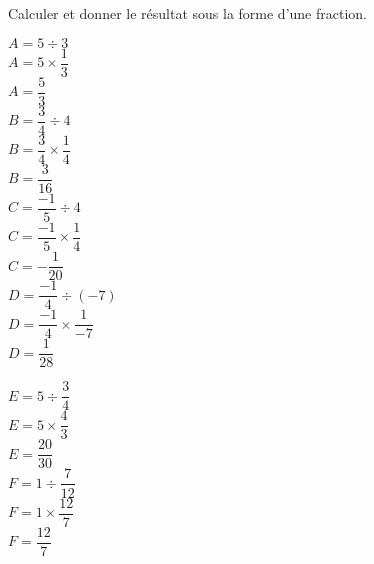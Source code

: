 \begin{corrige}
    Calculer et donner le résultat sous la forme d'une fraction.
    \vspace*{-5mm}
    \begin{multicols}{2}
        \begin{spacing}{1.5}            
            \begin{itemize}
                \def\item{}
                \item $A=5\div3$\\
                {\red $A=5\times \dfrac{1}{3}$\\$A=\dfrac{5}{3}$}\\
                \item $B=\dfrac{3}{4}\div 4$\\
                {\red $B=\dfrac{3}{4}\times \dfrac{1}{4}$\\$B=\dfrac{3}{16}$}\\
                \item $C=\dfrac{-1}{5}\div 4$\\
                {\red $C=\dfrac{-1}{5}\times \dfrac{1}{4}$\\$C=-\dfrac{1}{20}$}\\
                \item $D=\dfrac{-1}{4}\div (-7)$\\
                {\red $D=\dfrac{-1}{4}\times \dfrac{1}{-7}$\\$D=\dfrac{1}{28}$}\\
            \end{itemize}
        \end{spacing}
    \end{multicols}
    \Coupe
    \begin{multicols}{2}
        \begin{spacing}{1.5}
            \begin{itemize}
                \def\item{}
                \item $E=5\div\dfrac{3}{4}$\\
                {\red $E=5\times\dfrac{4}{3}$\\$E=\dfrac{20}{30}$}\\
                \item $F=1\div\dfrac{7}{12}$\\
                {\red $F=1\times\dfrac{12}{7}$\\$F=\dfrac{12}{7}$}\\

\end{itemize}
\end{spacing}
\end{multicols}
\end{corrige}
